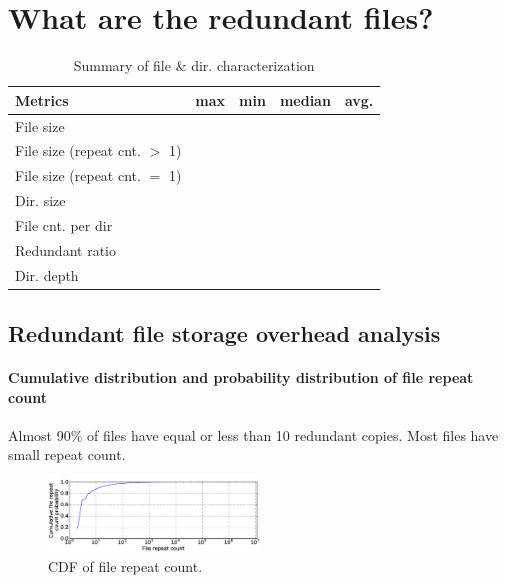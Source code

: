 \section{What are the redundant files?}
\label{sec:redundant_files}

\begin{table} 
	\centering 
	\scriptsize  
	\caption{Summary of file \& dir. characterization} \label{tbl:sum_file_dir_char} 
	\begin{tabular}{|l|l|l|l|l|}%
		\hline 
		Metrics & max & min & median & avg.\\
		\hline
		File size &   &   &   &  \\
		\hline
		File size (repeat cnt. $>$ 1) &   &   &    &  \\
		\hline
		File size (repeat cnt. $=$ 1) &   &   &    &  \\
		\hline
		\hline
		Dir. size &  &  & & \\
		\hline
		File cnt. per dir & &  &  & \\
		\hline
		Redundant ratio & &  &  & \\
		\hline
		Dir. depth  &  &  & & \\
		\hline
	\end{tabular} 
\end{table} 

\subsection{Redundant file storage overhead analysis}

\paragraph{Cumulative distribution and probability distribution of file repeat count}

Almost 90\% of files have equal or less than 10 redundant copies. Most files have small repeat count.

\begin{figure}
	\centering
	\includegraphics[width=0.5\textwidth]{graphs/File_repeat_count.eps}
	\caption{CDF of file repeat count.
	}
	\label{fig:file_repeat_count}
\end{figure}

